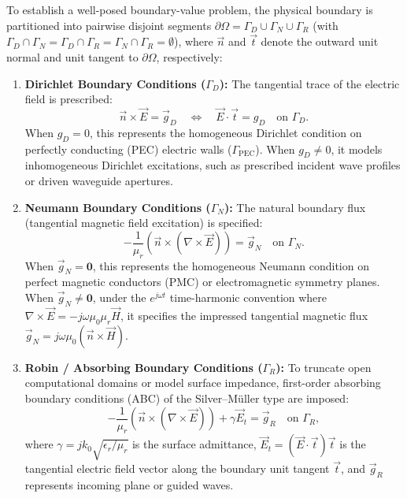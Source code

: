 \documentclass[VANCOUVER,Times1COL]{WileyNJD-v5}
\begin{document}
To establish a well-posed boundary-value problem, the physical boundary is partitioned into pairwise disjoint segments $\partial\Omega = \Gamma_D \cup \Gamma_N \cup \Gamma_R$ (with $\Gamma_D \cap \Gamma_N = \Gamma_D \cap \Gamma_R = \Gamma_N \cap \Gamma_R = \emptyset$), where $\vec{n}$ and $\vec{t}$ denote the outward unit normal and unit tangent to $\partial\Omega$, respectively:
\begin{enumerate}
    \item \textbf{Dirichlet Boundary Conditions ($\Gamma_D$):} The tangential trace of the electric field is prescribed:
          \begin{equation}
              \vec{n} \times \vec{E} = \vec{g}_D \quad \iff \quad \vec{E} \cdot \vec{t} = g_D \quad \text{on } \Gamma_D.
              \label{eq:pec_bc}
          \end{equation}
          When $g_D = 0$, this represents the homogeneous Dirichlet condition on perfectly conducting (PEC) electric walls ($\Gamma_{\mathrm{PEC}}$). When $g_D \ne 0$, it models inhomogeneous Dirichlet excitations, such as prescribed incident wave profiles or driven waveguide apertures.
    \item \textbf{Neumann Boundary Conditions ($\Gamma_N$):} The natural boundary flux (tangential magnetic field excitation) is specified:
          \begin{equation}
              -\frac{1}{\mu_r} \left(\vec{n} \times (\nabla \times \vec{E})\right) = \vec{g}_N \quad \text{on } \Gamma_N.
              \label{eq:neumann_bvp_pde}
          \end{equation}
          When $\vec{g}_N = \mathbf{0}$, this represents the homogeneous Neumann condition on perfect magnetic conductors (PMC) or electromagnetic symmetry planes. When $\vec{g}_N \ne \mathbf{0}$, under the $e^{j\omega t}$ time-harmonic convention where $\nabla \times \vec{E} = -j\omega\mu_0\mu_r\vec{H}$, it specifies the impressed tangential magnetic flux $\vec{g}_N = j\omega\mu_0 (\vec{n} \times \vec{H})$.
    \item \textbf{Robin / Absorbing Boundary Conditions ($\Gamma_R$):} To truncate open computational domains or model surface impedance, first-order absorbing boundary conditions (ABC) of the Silver--M{\"u}ller type are imposed:
          \begin{equation}
              -\frac{1}{\mu_r} \left(\vec{n} \times (\nabla \times \vec{E})\right) + \gamma \vec{E}_t = \vec{g}_R \quad \text{on } \Gamma_R,
              \label{eq:robin_bvp_pde}
          \end{equation}
          where $\gamma = j k_0 \sqrt{\epsilon_r / \mu_r}$ is the surface admittance, $\vec{E}_t = (\vec{E} \cdot \vec{t})\vec{t}$ is the tangential electric field vector along the boundary unit tangent $\vec{t}$, and $\vec{g}_R$ represents incoming plane or guided waves.
\end{enumerate}
\end{document}

